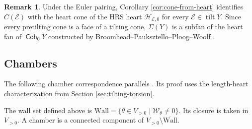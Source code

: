 \documentclass[a4paper,reqno]{amsart}
\def\E{\mathcal{E}}
\def\H{\mathcal{H}}
\def\W{\mathcal{W}}
\DeclareMathOperator{\Coh}{\mathsf{Coh}}
\DeclareMathOperator{\tilt}{tilt}
\theoremstyle{definition}
\newtheorem{Rem}[Thm]{Remark}
\begin{document}
\begin{Rem}
Under the Euler pairing, Corollary \ref{cor:cone-from-heart} identifies $C(\E)$ with the heart cone of the HRS heart $\H_{\E,0}$ for every $\E\in\tilt Y$. Since every pretilting cone is a face of a tilting cone, $\Sigma(Y)$ is a subfan of the heart fan of $\Coh_0Y$ constructed by Broomhead--Pauksztello--Ploog--Woolf \cite[Theorem-Definition 3.7]{BPPW24}.
\end{Rem}

\subsection{Chambers}

The following chamber correspondence parallels \cite[Theorem 3.17]{Asa21}. Its proof uses the length-heart characterization from Section \ref{sec:tilting-torsion}.

The wall set defined above is $\mathrm{Wall}=\{\theta\in V_{>0}\mid\W_\theta\ne0\}$. Its closure is taken in $V_{>0}$. A chamber is a connected component of $V_{>0}\setminus\overline{\mathrm{Wall}}$.
\end{document}
